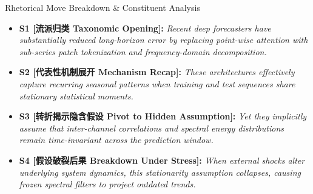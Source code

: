 \begin{TipBox}{Rhetorical Move Breakdown \& Constituent Analysis}
\begin{itemize}[leftmargin=1.5em]
  \item \textbf{S1 [流派归类 Taxonomic Opening]:} \textit{Recent deep forecasters have substantially reduced long-horizon error by replacing point-wise attention with sub-series patch tokenization and frequency-domain decomposition.}\par{}
  \item \textbf{S2 [代表性机制展开 Mechanism Recap]:} \textit{These architectures effectively capture recurring seasonal patterns when training and test sequences share stationary statistical moments.}\par{}
  \item \textbf{S3 [转折揭示隐含假设 Pivot to Hidden Assumption]:} \textit{Yet they implicitly assume that inter-channel correlations and spectral energy distributions remain time-invariant across the prediction window.}\par{}
  \item \textbf{S4 [假设破裂后果 Breakdown Under Stress]:} \textit{When external shocks alter underlying system dynamics, this stationarity assumption collapses, causing frozen spectral filters to project outdated trends.}\par{}
\end{itemize}
\end{TipBox}
\medskip
